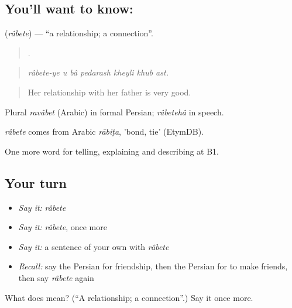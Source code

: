 \subsection*{You'll want to know: }
\textbf{} (\emph{râbete}) — \textquotedblleft{}a relationship; a connection\textquotedblright{}.

\begin{quote}
      .
\end{quote}

\begin{quote}
\emph{râbete-ye u bâ pedarash kheyli khub ast.}
\end{quote}

\begin{quote}
Her relationship with her father is very good.
\end{quote}

Plural \emph{ravâbet} (Arabic) in formal Persian; \emph{râbetehâ} in speech.

\begin{cousinweb}
\emph{râbete} comes from Arabic \emph{rābiṭa}, 'bond, tie' (EtymDB).
\end{cousinweb}

\begin{grammarlens}[title={What you've built}]
One more word for telling, explaining and describing at B1.
\end{grammarlens}

\subsection*{Your turn}
\begin{itemize}
\raggedright
  \item \emph{Say it:} \emph{râbete}
  \item \emph{Say it:} \emph{râbete}, once more
  \item \emph{Say it:} a sentence of your own with \emph{râbete}
  \item \emph{Recall:} say the Persian for friendship, then the Persian for to make friends, then say \emph{râbete} again
\end{itemize}

\begin{tcolorbox}[breakable,colback=teal!4,colframe=teal!35!black,title={Before you move on}]
What does  mean? (\textquotedblleft{}A relationship; a connection\textquotedblright{}.) Say it once more.
\end{tcolorbox}
